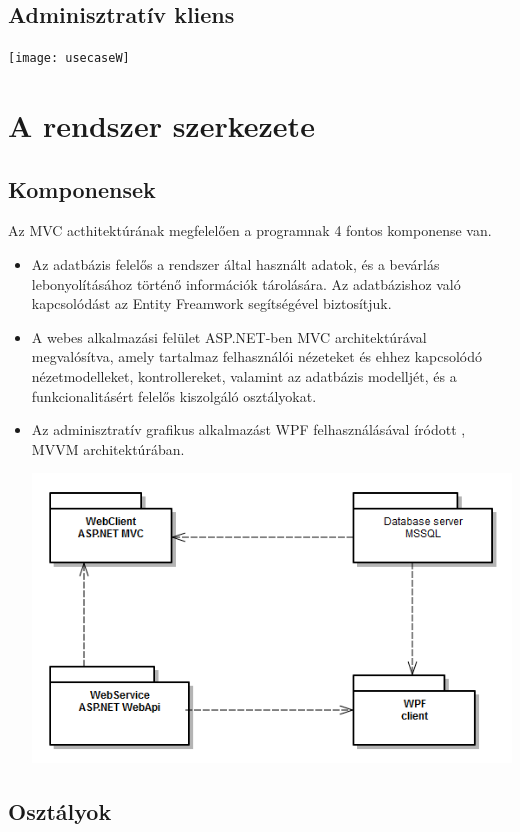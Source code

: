 \documentclass[12pt,a4paper]{article}
\begin{document}
\subsection{Adminisztratív kliens}
\texttt{[image: usecaseW]}

\section{A rendszer szerkezete}
\subsection{Komponensek}
Az MVC acthitektúrának megfelelően a programnak 4 fontos komponense van.
\begin{itemize}
\item Az adatbázis felelős a rendszer által használt adatok, és a bevárlás lebonyolításához történő információk tárolására. Az adatbázishoz való kapcsolódást az  Entity Freamwork segítségével biztosítjuk.
\item A webes alkalmazási felület ASP.NET-ben MVC architektúrával megvalósítva, amely tartalmaz felhasználói nézeteket és ehhez kapcsolódó nézetmodelleket, kontrollereket, valamint az adatbázis modelljét, és a funkcionalitásért felelős kiszolgáló osztályokat.
\item Az adminisztratív grafikus alkalmazást WPF felhasználásával íródott , MVVM architektúrában.


\begin{center}
\includegraphics[scale=0.5]{component}
\end{center}

\end{itemize}
\subsection{Osztályok}
\end{document}
